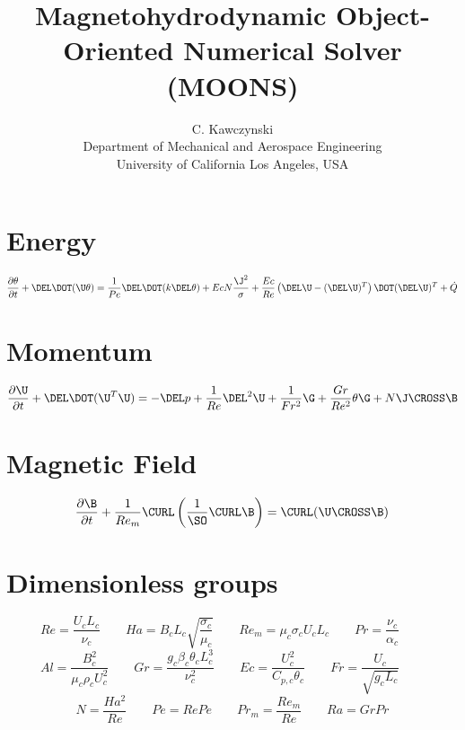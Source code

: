 \documentclass[11pt]{article}
\begin{document}
\doublespacing
\title{Magnetohydrodynamic Object-Oriented Numerical Solver (MOONS)}
\author{C. Kawczynski \\
Department of Mechanical and Aerospace Engineering \\
University of California Los Angeles, USA\\}


\section{Energy}
\Large
\begin{equation}
	\frac{\partial \theta}{\partial t} +
	\DEL \DOT (\U \theta)
	=
	\frac{1}{Pe}
	\DEL \DOT (k \DEL \theta) +
	Ec N
	\frac{{\J}^2}{\sigma} +
	\frac{Ec}{Re}
	\left(
	\DEL \U
	-
	(\DEL \U)^T
	\right) \DOT
	(\DEL \U)^T +
	\dot{Q}
\end{equation}
\section{Momentum}
\begin{equation}
	\frac{\partial \U}{\partial t} +
	\DEL \DOT (\U^T \U)
	=
	- \DEL p
	+ \frac{1}{Re}
	\DEL^2 \U
	+ \frac{1}{Fr^2}
	\G
	+ \frac{Gr}{Re^2}
	\theta \G
	+ N
	\J \CROSS \B
\end{equation}
\section{Magnetic Field}
\begin{equation}
	\frac{\partial \B}{\partial t}
	+ \frac{1}{Re_m} \CURL \left(\frac{1}{\SO} \CURL \B \right)
	= \CURL (\U \CROSS \B)
\end{equation}

\section{Dimensionless groups}
\begin{equation}
	Re = \frac{U_c L_c}{\nu_c} \qquad
	Ha = B_c L_c \sqrt{\frac{\sigma_c}{\mu_c}} \qquad
	Re_m = \mu_c \sigma_c U_c L_c \qquad
	Pr = \frac{\nu_c}{\alpha_c} \qquad
\end{equation}
\begin{equation}
	Al = \frac{B_c^2}{\mu_c \rho_c U_c^2} \qquad
	Gr = \frac{g_c \beta_c \theta_c L_c^3}{\nu_c^2} \qquad
	Ec = \frac{U_c^2}{C_{p,c} \theta_c} \qquad
	Fr = \frac{U_c}{\sqrt{g_c L_c}} \qquad
\end{equation}
\begin{equation}
	N = \frac{Ha^2}{Re} \qquad
	Pe = Re Pe \qquad
	Pr_{m} = \frac{Re_m}{Re} \qquad
	Ra = Gr Pr
\end{equation}
\end{document}
